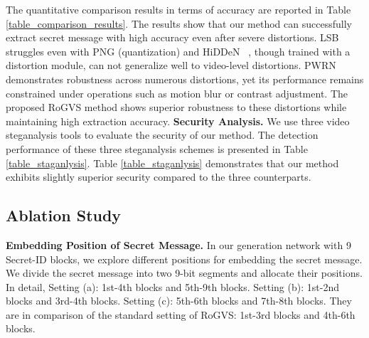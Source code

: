 \documentclass{article}
\begin{document}
The quantitative comparison results in terms of accuracy are reported in Table \ref{table_comparison_results}.
The results show that our method can successfully extract secret message with high accuracy even after severe distortions. 
LSB ~\cite{chan2004lsb} struggles even with PNG (quantization) and HiDDeN ~\cite{zhu2018hidden}, though trained with a distortion module, can not generalize well to video-level distortions.
PWRN ~\cite{li2022anti} demonstrates robustness across numerous distortions, yet its performance remains constrained under operations such as motion blur or contrast adjustment.
The proposed RoGVS method shows superior robustness to these distortions while maintaining high extraction accuracy.
\noindent\textbf{Security Analysis.} We use three video steganalysis tools to evaluate the security of our method.
The detection performance of these three steganalysis schemes is presented in Table \ref{table_staganlysis}. Table \ref{table_staganlysis} demonstrates that our method exhibits slightly superior security compared to the three counterparts.
\begin{table}[!t]\small
\caption{\textbf{Quantitative Security Analysis. }Evaluation metric: AUC. Closer to 0.5 indicates higher performance.}
	\label{table_staganlysis}
\renewcommand{\arraystretch}{1.2}
	\begin{center}
	\end{center}
\end{table}


\subsection{Ablation Study}
\noindent\textbf{Embedding Position of Secret Message.}
In our generation network with 9 Secret-ID blocks, we explore different positions for embedding the secret message. We divide the secret message into two 9-bit segments and allocate their positions.
In detail, Setting (a): 1st-4th blocks and 5th-9th blocks. 
Setting (b): 1st-2nd blocks and 3rd-4th blocks.
Setting (c): 5th-6th blocks and 7th-8th blocks. 
They are in comparison of the standard setting of RoGVS: 1st-3rd blocks and 4th-6th blocks.
\end{document}
